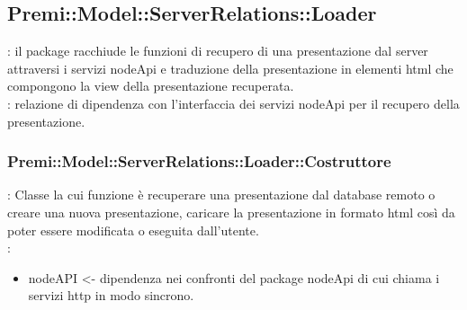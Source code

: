 \subsection{Premi::Model::ServerRelations::Loader}{
		\textbf{\tipo}: il package racchiude le funzioni di recupero di una presentazione dal server attraversi i servizi nodeApi e traduzione della presentazione in elementi html che compongono la view della presentazione recuperata.\\
		\textbf{\relaz}: relazione di dipendenza con l’interfaccia dei servizi nodeApi per il recupero della presentazione.\\

\subsubsection{Premi::Model::ServerRelations::Loader::Costruttore}{
				\textbf{\tipo}: Classe la cui funzione è recuperare una presentazione dal database remoto o creare una nuova presentazione,  caricare la presentazione in formato html così da poter essere modificata o eseguita dall’utente.\\	
				\textbf{\relaz}: 
				\begin{itemize}
					\item nodeAPI <- dipendenza nei confronti del package nodeApi di cui chiama i servizi http in modo sincrono.
				\end{itemize}	
                    }
}

